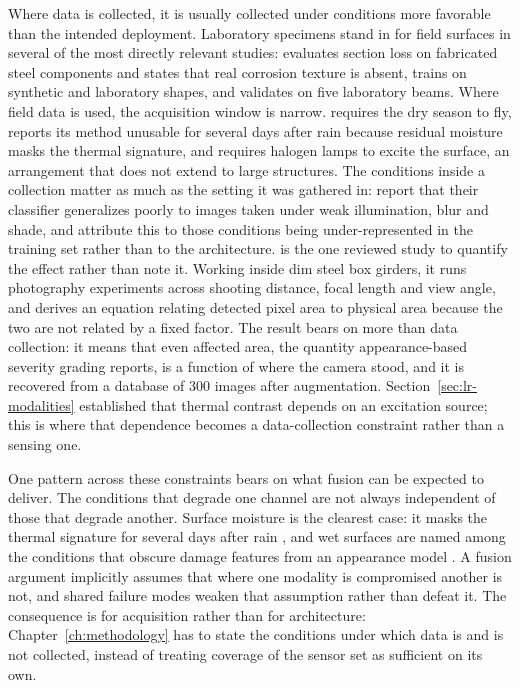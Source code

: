 Where data is collected, it is usually collected under conditions more
favorable than the intended deployment. Laboratory specimens stand in for field
surfaces in several of the most directly relevant studies: \citet{Maru2025} evaluates
section loss on fabricated steel components and states that real corrosion
texture is absent, \citet{Asad2026} trains on synthetic and laboratory shapes, and
\citet{Phannakham2026} validates on five laboratory beams. Where field data is used, the
acquisition window is narrow. \citet{Guedes2025} requires the dry season to fly, \citet{Yamashita2025}
reports its method unusable for several days after rain because residual
moisture masks the thermal signature, and \citet{Lim2021} requires halogen lamps to
excite the surface, an arrangement that does not extend to large structures.
The conditions inside a
collection matter as much as the setting it was gathered in: \citet{Yao2019}
report that their classifier generalizes poorly to images taken under weak
illumination, blur and shade, and attribute this to those conditions being
under-represented in the training set rather than to the architecture.
\citet{Jiang2023} is the one reviewed study to quantify the effect rather than
note it. Working inside dim steel box girders, it runs photography experiments
across shooting distance, focal length and view angle, and derives an equation
relating detected pixel area to physical area because the two are not related by
a fixed factor. The result bears on more than data collection: it means that
even affected area, the quantity appearance-based severity grading reports, is a
function of where the camera stood, and it is recovered from a database of 300
images after augmentation.
Section~\ref{sec:lr-modalities} established that thermal contrast depends on an
excitation source; this is where that dependence becomes a data-collection
constraint rather than a sensing one.

One pattern across these constraints bears on what fusion can be expected to
deliver. The conditions that degrade one channel are not always independent of
those that degrade another. Surface moisture is the clearest case: it masks the
thermal signature for several days after rain \citep{Yamashita2025}, and wet
surfaces are named among the conditions that obscure damage features from an
appearance model \citep{Maharjan2025}. A fusion argument implicitly assumes that
where one modality is compromised another is not, and shared failure modes
weaken that assumption rather than defeat it. The consequence is for acquisition
rather than for architecture: Chapter~\ref{ch:methodology} has to state the
conditions under which data is and is not collected, instead of treating
coverage of the sensor set as sufficient on its own.

